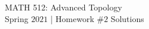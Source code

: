 \begin{center}

{\Large MATH 512: Advanced Topology \\[0ex]
Spring $2021$ | Homework $\#2$ Solutions}
\end{center}

\vspace{0.1in}





\bracketedpoints


